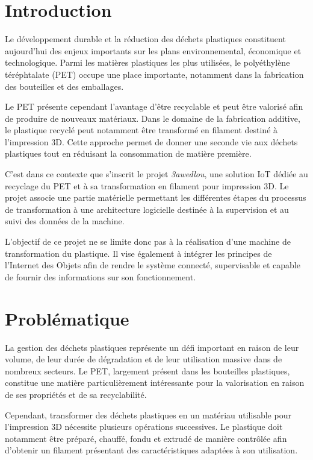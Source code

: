 
\section{Introduction}

Le développement durable et la réduction des déchets plastiques constituent
aujourd'hui des enjeux importants sur les plans environnemental, économique
et technologique. Parmi les matières plastiques les plus utilisées, le
polyéthylène téréphtalate (PET) occupe une place importante, notamment dans
la fabrication des bouteilles et des emballages.

Le PET présente cependant l'avantage d'être recyclable et peut être valorisé
afin de produire de nouveaux matériaux. Dans le domaine de la fabrication
additive, le plastique recyclé peut notamment être transformé en filament
destiné à l'impression 3D. Cette approche permet de donner une seconde vie
aux déchets plastiques tout en réduisant la consommation de matière première.

C'est dans ce contexte que s'inscrit le projet \textit{3awedlou}, une
solution IoT dédiée au recyclage du PET et à sa transformation en filament
pour impression 3D. Le projet associe une partie matérielle permettant les
différentes étapes du processus de transformation à une architecture
logicielle destinée à la supervision et au suivi des données de la machine.

L'objectif de ce projet ne se limite donc pas à la réalisation d'une
machine de transformation du plastique. Il vise également à intégrer les
principes de l'Internet des Objets afin de rendre le système connecté,
supervisable et capable de fournir des informations sur son fonctionnement.

\section{Problématique}

La gestion des déchets plastiques représente un défi important en raison de
leur volume, de leur durée de dégradation et de leur utilisation massive
dans de nombreux secteurs. Le PET, largement présent dans les bouteilles
plastiques, constitue une matière particulièrement intéressante pour la
valorisation en raison de ses propriétés et de sa recyclabilité.

Cependant, transformer des déchets plastiques en un matériau utilisable
pour l'impression 3D nécessite plusieurs opérations successives. Le
plastique doit notamment être préparé, chauffé, fondu et extrudé de manière
contrôlée afin d'obtenir un filament présentant des caractéristiques
adaptées à son utilisation.


